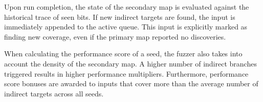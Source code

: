 Upon run completion, the state of the secondary map is evaluated against the historical trace of seen bits. If new indirect targets are found, the input is immediately appended to the active queue. This input is explicitly marked as finding new coverage, even if the primary map reported no discoveries.

When calculating the performance score of a seed, the fuzzer also takes into account the density of the secondary map. A higher number of indirect branches triggered results in higher performance multipliers. Furthermore, performance score bonuses are awarded to inputs that cover more than the average number of indirect targets across all seeds.